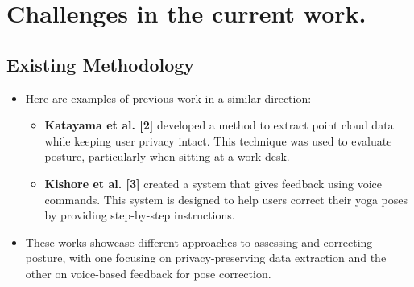 \section{Challenges in the current work.}
\subsection{Existing Methodology}
\begin{itemize}
\item Here are examples of previous work in a similar direction:

\begin{itemize}

\item \textbf{Katayama et al. [2]} developed a method to extract point cloud data while keeping user privacy intact. This technique was used to evaluate posture, particularly when sitting at a work desk.
\item \textbf{Kishore et al. [3]} created a system that gives feedback using voice commands. This system is designed to help users correct their yoga poses by providing step-by-step instructions.
\end{itemize}
\item These works showcase different approaches to assessing and correcting posture, with one focusing on privacy-preserving data extraction and the other on voice-based feedback for pose correction.
\end{itemize}

